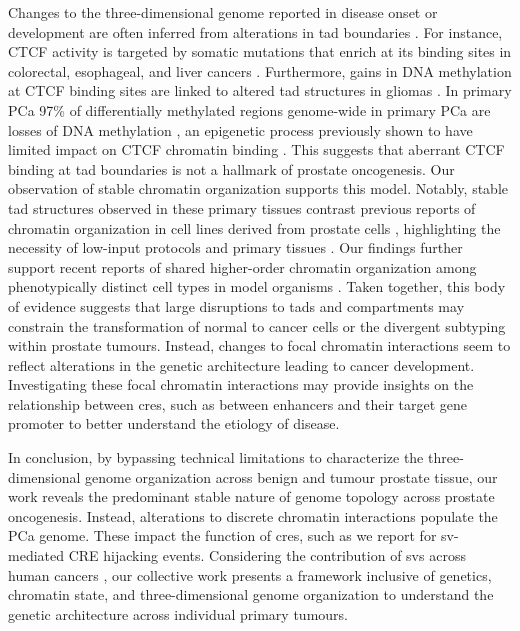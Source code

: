 Changes to the three-dimensional genome reported in disease onset or development are often inferred from alterations in \gls{tad} boundaries \cite{oudelaarRelationshipGenomeStructure2020,akdemirDisruptionChromatinFolding2020}.
For instance,  CTCF activity is targeted by somatic mutations that enrich at its binding sites in colorectal, esophageal, and liver cancers \cite{katainenCTCFCohesinbindingSites2015,guoMutationHotspotsCTCF2018}.
Furthermore, gains in DNA methylation at CTCF binding sites are linked to altered \gls{tad} structures in gliomas \cite{flavahanInsulatorDysfunctionOncogene2016}.
In primary PCa 97\% of differentially methylated regions genome-wide in primary PCa are losses of DNA methylation \cite{zhaoDNAMethylationLandscape2020,yuWholeGenomeMethylationSequencing2013}, an epigenetic process previously shown to have limited impact on CTCF chromatin binding \cite{mauranoRoleDNAMethylation2015}.
This suggests that aberrant CTCF binding at \gls{tad} boundaries is not a hallmark of prostate oncogenesis.
Our observation of stable chromatin organization supports this model.
Notably, stable \gls{tad} structures observed in these primary tissues contrast previous reports of chromatin organization in cell lines derived from prostate cells \cite{taberlayThreedimensionalDisorganizationCancer2016,rhieHighresolution3DEpigenomic2019}, highlighting the necessity of low-input protocols and primary tissues \cite{diazChromatinConformationAnalysis2018}.
Our findings further support recent reports of shared higher-order chromatin organization among phenotypically distinct cell types in model organisms \cite{rao3DMapHuman2014,dixonTopologicalDomainsMammalian2012,ing-simmonsIndependenceChromatinConformation2021,ghavi-helmHighlyRearrangedChromosomes2019,iyyankiSubtypeassociatedEpigenomicLandscape2021,akdemirDisruptionChromatinFolding2020}.
Taken together, this body of evidence suggests that large disruptions to \glspl{tad} and compartments may constrain the transformation of normal to cancer cells or the divergent subtyping within prostate tumours.
Instead, changes to focal chromatin interactions seem to reflect alterations in the genetic architecture leading to cancer development.
Investigating these focal chromatin interactions may provide insights on the relationship between \glspl{cre}, such as between enhancers and their target gene promoter \cite{gasperiniComprehensiveCatalogueValidated2020,nasserGenomewideEnhancerMaps2021} to better understand the etiology of disease.

In conclusion, by bypassing technical limitations to characterize the three-dimensional genome organization across benign and tumour prostate tissue, our work reveals the predominant stable nature of genome topology across prostate oncogenesis.
Instead, alterations to discrete chromatin interactions populate the PCa genome.
These impact the function of \glspl{cre}, such as we report for \gls{sv}-mediated CRE hijacking events.
Considering the contribution of \glspl{sv} across human cancers \cite{hanahanHallmarksCancerNext2011}, our collective work presents a framework inclusive of genetics, chromatin state, and three-dimensional genome organization to understand the genetic architecture across individual primary tumours.
